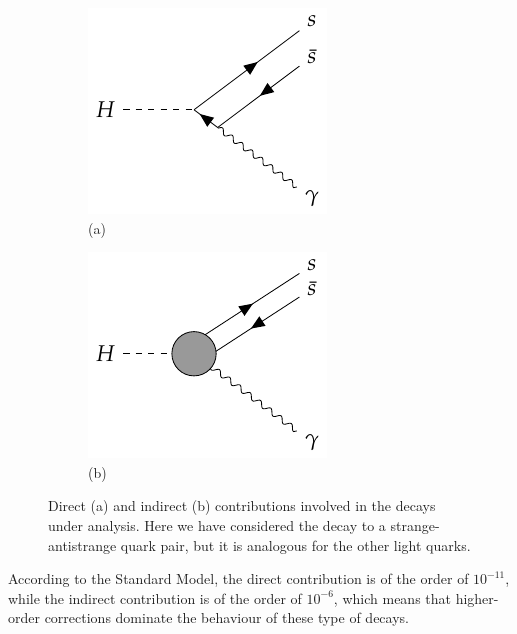 \begin{figure}[!ht]
    \captionsetup[subfigure]{labelformat=empty}
    \vspace*{-0.2cm}
    \centering
    \setlength{\mylength}{\textwidth}
    \begin{subfigure}[t]{0.5\mylength}
            \centering
            \includegraphics[height=0.26\mylength]{resources/H_rare_decays_vertices/v1.pdf}
            \setlength{\unitlength}{0.26\mylength}
            \caption{\footnotesize (a)}
    \end{subfigure}%
    \begin{subfigure}[t]{0.5\mylength}
            \centering
            \includegraphics[height=0.26\mylength]{resources/H_rare_decays_vertices/v2_2.pdf}
            \setlength{\unitlength}{0.26\mylength}
            \caption{\footnotesize (b)}
    \end{subfigure}%
    \vspace*{-0.0cm}
    \caption{Direct (a) and indirect (b) contributions involved in the decays under analysis. Here we have considered the decay to a strange-antistrange quark pair, but it is analogous for the other light quarks.}
    \label{fig:Higgs_rare_decay_veritces}
    \vspace*{-0.0cm}
\end{figure}

According to the Standard Model, the direct contribution is of the order of $10^{-11}$, while the indirect contribution is of the order of $10^{-6}$, which means that higher-order corrections dominate the behaviour of these type of decays.

